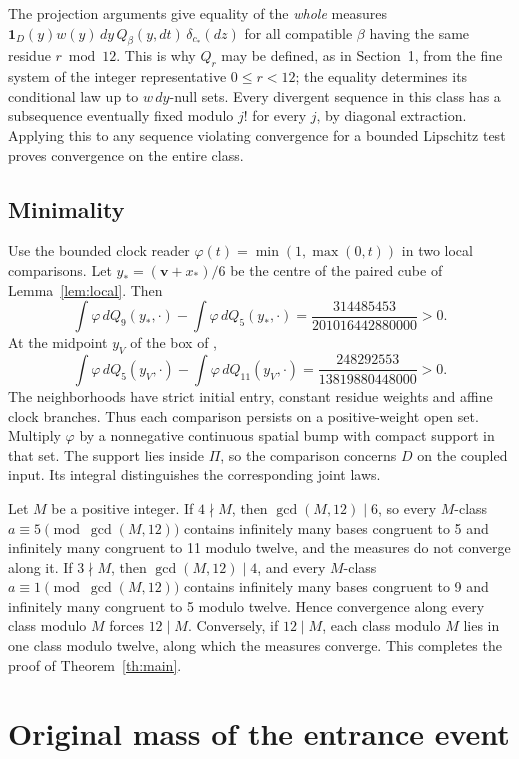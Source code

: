 \documentclass[11pt,reqno]{amsart}
\theoremstyle{definition}
\newcommand{\vct}{\mathbf v}
\newcommand{\cen}{c_*}
\newcommand{\one}{\mathbf 1}
\begin{document}
The projection arguments give equality of the \emph{whole} measures
\(\one_D(y)w(y)\,dy\,Q_\beta(y,dt)\,\delta_{\cen}(dz)\) for all compatible
\(\beta\) having the same residue \(r\bmod12\). This is why \(Q_r\) may be
defined, as in Section~1, from the fine system of the integer
representative \(0\le r<12\); the equality determines its conditional law
up to \(w\,dy\)-null sets. Every divergent sequence in this class has a
subsequence eventually fixed modulo \(j!\) for every \(j\), by diagonal
extraction. Applying this to any sequence violating convergence for a
bounded Lipschitz test proves convergence on the entire class.

\subsection{Minimality}
Use the bounded clock reader \(\varphi(t)=\min(1,\max(0,t))\) in two local
comparisons. Let \(y_*=(\vct+x_*)/6\) be the centre of the paired cube of
Lemma~\ref{lem:local}. Then
\[
 \int\varphi\,dQ_9(y_*,\cdot)-\int\varphi\,dQ_5(y_*,\cdot)
 =\frac{314485453}{201016442880000}>0 .
\]
At the midpoint \(y_V\) of the box of \cite[Theorem~4]{G7},
\[
 \int\varphi\,dQ_5(y_V,\cdot)-\int\varphi\,dQ_{11}(y_V,\cdot)
 =\frac{248292553}{13819880448000}>0 .
\]
The neighborhoods have strict initial entry, constant residue
weights and affine clock branches. Thus each comparison persists
on a positive-weight open set. Multiply \(\varphi\) by a nonnegative
continuous spatial bump with compact support in that set. The support
lies inside \(\Pi\), so the comparison concerns \(D\) on the coupled
input. Its integral distinguishes the corresponding joint laws.

Let \(M\) be a positive integer. If \(4\nmid M\), then
\(\gcd(M,12)\mid6\), so every \(M\)-class \(a\equiv5\pmod{\gcd(M,12)}\)
contains infinitely many bases congruent to 5 and infinitely many
congruent to 11 modulo twelve, and the measures do not converge along
it. If \(3\nmid M\), then \(\gcd(M,12)\mid4\), and every \(M\)-class
\(a\equiv1\pmod{\gcd(M,12)}\) contains infinitely many bases congruent
to 9 and infinitely many congruent to 5 modulo twelve. Hence convergence
along every class modulo \(M\) forces \(12\mid M\). Conversely, if
\(12\mid M\), each class modulo \(M\) lies in one class modulo twelve,
along which the measures converge. This completes the proof of
Theorem~\ref{th:main}.

\section{Original mass of the entrance event}\label{sec:mass}
\end{document}
